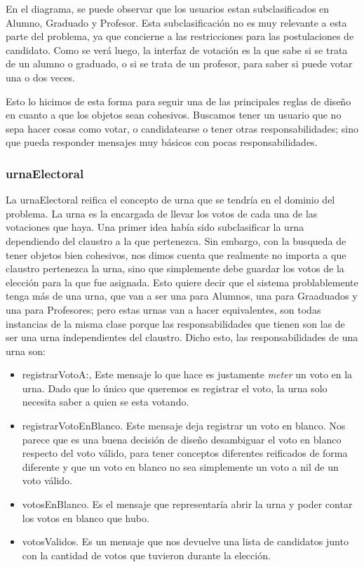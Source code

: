 En el diagrama, se puede observar que los usuarios estan subclasificados en Alumno, Graduado y Profesor. Esta subclasificaci\'on no es muy relevante a esta parte del problema, ya que concierne a las restricciones para las postulaciones de candidato. Como se ver\'a luego, la interfaz de votaci\'on es la que sabe si se trata de un alumno o graduado, o si se trata de un profesor, para saber si puede votar una o dos veces.

Esto lo hicimos de esta forma para seguir una de las principales reglas de diseño en cuanto a que los objetos sean cohesivos. Buscamos tener un usuario que no sepa hacer cosas como votar, o candidatearse o tener otras responsabilidades; sino que pueda responder mensajes muy b\'asicos con pocas responsabilidades.

\subsubsection{urnaElectoral}

La urnaElectoral reifica el concepto de urna que se tendr\'ia en el dominio del problema. La urna es la encargada de llevar los votos de cada una de las votaciones que haya. Una primer idea hab\'ia sido subclasificar la urna dependiendo del claustro a la que pertenezca. Sin embargo, con la busqueda de tener objetos bien cohesivos, nos dimos cuenta que realmente no importa a que claustro pertenezca la urna, sino que simplemente debe guardar los votos de la elecci\'on para la que fue asignada. Esto quiere decir que el sistema problablemente tenga m\'as de una urna, que van a ser una para Alumnos, una para Graaduados y una para Profesores; pero estas urnas van a hacer equivalentes, son todas instancias de la misma clase porque las responsabilidades que tienen son las de ser una urna independientes del claustro. Dicho esto, las responsabilidades de una urna son:

\begin{itemize} 
\item registrarVotoA:, Este mensaje lo que hace es justamente \emph{meter} un voto en la urna. Dado que lo \'unico que queremos es registrar el voto, la urna solo necesita saber a quien se esta votando.
\item registrarVotoEnBlanco. Este mensaje deja registrar un voto en blanco. Nos parece que es una buena decisi\'on de diseño desambiguar el voto en blanco respecto del voto v\'alido, para tener conceptos diferentes reificados de forma diferente y que un voto en blanco no sea simplemente un voto a nil de un voto v\'alido.
\item votosEnBlanco. Es el mensaje que representar\'ia abrir la urna y poder contar los votos en blanco que hubo.
\item votosValidos. Es un mensaje que nos devuelve una lista de candidatos junto con la cantidad de votos que tuvieron durante la elecci\'on.
\end{itemize}



